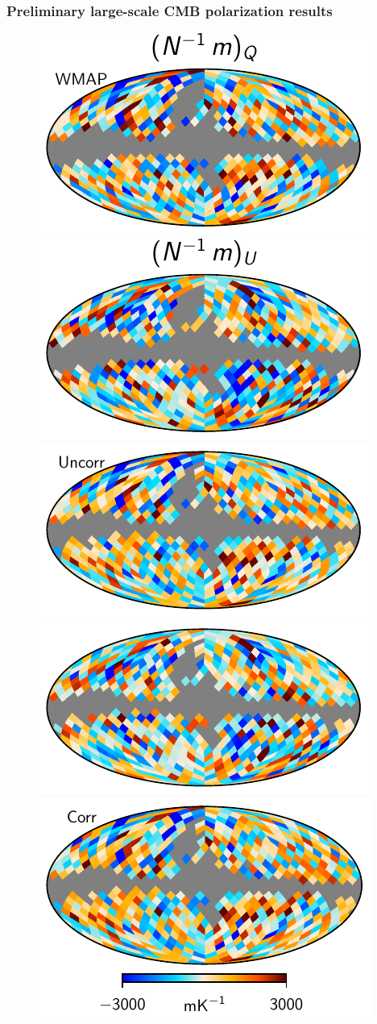 \documentclass[twocolumn]{../../common/aa}
\begin{document}
\subsubsection{Preliminary large-scale CMB polarization results}
\label{sec:lowl_cmb}


\begin{figure}[t]
  \centering
        \includegraphics[width=0.49\linewidth]{figures/wtr39yrKaQVmapq.pdf}
        \includegraphics[width=0.49\linewidth]{figures/wtr39yrKaQVmapu.pdf}\\
        \includegraphics[width=0.49\linewidth]{figures/wmap_reprod_KaQV_9yr_q_scale.pdf}
        \includegraphics[width=0.49\linewidth]{figures/wmap_reprod_KaQV_9yr_u_scale.pdf}\\
        \includegraphics[width=0.49\linewidth]{figures/wmap_reprod_tempcorr_KaQV_9yr_q_scale.pdf}

\end{figure}
\end{document}
